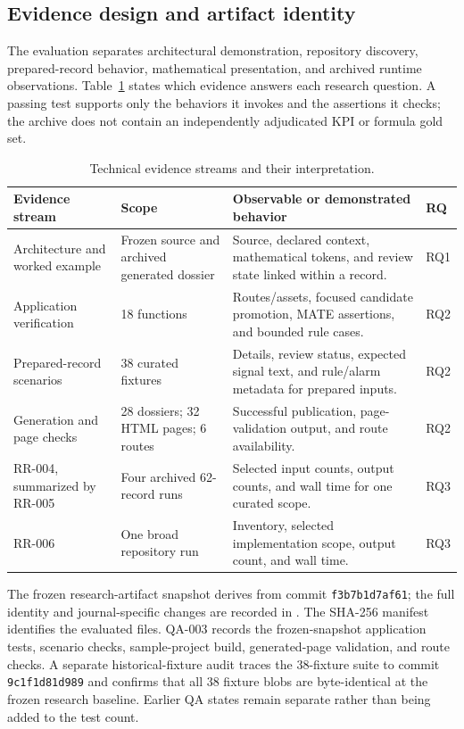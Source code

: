 \documentclass[a4paper,fleqn]{cas-dc}
\begin{document}
\subsection{Evidence design and artifact identity}

The evaluation separates architectural demonstration, repository discovery, prepared-record behavior, mathematical presentation, and archived runtime observations. Table~\ref{tab:studies} states which evidence answers each research question. A passing test supports only the behaviors it invokes and the assertions it checks; the archive does not contain an independently adjudicated KPI or formula gold set.

\begin{table}[!t]
\centering
\caption{Technical evidence streams and their interpretation.}
\label{tab:studies}
\begin{tabularx}{\textwidth}{p{}p{}Xp{}}
\toprule
\textbf{Evidence stream} & \textbf{Scope} & \textbf{Observable or demonstrated behavior} & \textbf{RQ} \\
\midrule
Architecture and worked example & Frozen source and archived generated dossier & Source, declared context, mathematical tokens, and review state linked within a record. & RQ1 \\
Application verification & 18 functions & Routes/assets, focused candidate promotion, MATE assertions, and bounded rule cases. & RQ2 \\
Prepared-record scenarios & 38 curated fixtures & Details, review status, expected signal text, and rule/alarm metadata for prepared inputs. & RQ2 \\
Generation and page checks & 28 dossiers; 32 HTML pages; 6 routes & Successful publication, page-validation output, and route availability. & RQ2 \\
RR-004, summarized by RR-005 & Four archived 62-record runs & Selected input counts, output counts, and wall time for one curated scope. & RQ3 \\
RR-006 & One broad repository run & Inventory, selected implementation scope, output count, and wall time. & RQ3 \\
\bottomrule
\end{tabularx}
\end{table}

The frozen research-artifact snapshot derives from commit \texttt{f3b7b1d7af61}; the full identity and journal-specific changes are recorded in . The SHA-256 manifest identifies the evaluated files. QA-003 records the frozen-snapshot application tests, scenario checks, sample-project build, generated-page validation, and route checks. A separate historical-fixture audit traces the 38-fixture suite to commit \texttt{9c1f1d81d989} and confirms that all 38 fixture blobs are byte-identical at the frozen research baseline. Earlier QA states remain separate rather than being added to the test count.
\end{document}
